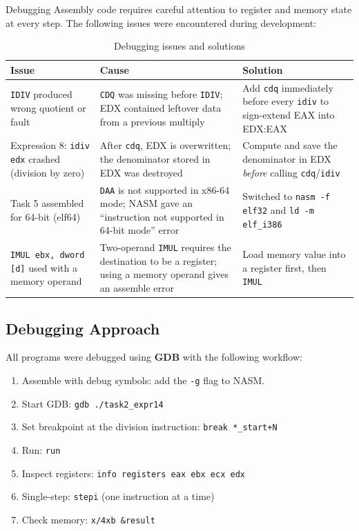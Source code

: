 \documentclass[12pt,a4paper]{article}
\begin{document}
Debugging Assembly code requires careful attention to register and memory state at every
step.  The following issues were encountered during development:

\begin{table}[H]
\centering
\caption{Debugging issues and solutions}
\small
\begin{tabular}{|p{4cm}|p{5cm}|p{5cm}|}
\hline
\textbf{Issue} & \textbf{Cause} & \textbf{Solution} \\
\hline
\texttt{IDIV} produced wrong quotient or fault & \texttt{CDQ} was missing before
\texttt{IDIV}; EDX contained leftover data from a previous multiply & Add \texttt{cdq}
immediately before every \texttt{idiv} to sign-extend EAX into EDX:EAX \\
\hline
Expression 8: \texttt{idiv edx} crashed (division by zero) & After \texttt{cdq}, EDX is
overwritten; the denominator stored in EDX was destroyed & Compute and save the
denominator in EDX \emph{before} calling \texttt{cdq}/\texttt{idiv} \\
\hline
Task 5 assembled for 64-bit (elf64) & \texttt{DAA} is not supported in x86-64 mode;
NASM gave an ``instruction not supported in 64-bit mode'' error & Switched to
\texttt{nasm -f elf32} and \texttt{ld -m elf\_i386} \\
\hline
\texttt{IMUL ebx, dword [d]} used with a memory operand & Two-operand \texttt{IMUL}
requires the destination to be a register; using a memory operand gives an assemble error
& Load memory value into a register first, then \texttt{IMUL} \\
\hline
\end{tabular}
\end{table}

\subsection{Debugging Approach}

All programs were debugged using \textbf{GDB} with the following workflow:

\begin{enumerate}
    \item Assemble with debug symbols: add the \texttt{-g} flag to NASM.
    \item Start GDB: \texttt{gdb ./task2\_expr14}
    \item Set breakpoint at the division instruction: \texttt{break *\_start+N}
    \item Run: \texttt{run}
    \item Inspect registers: \texttt{info registers eax ebx ecx edx}
    \item Single-step: \texttt{stepi} (one instruction at a time)
    \item Check memory: \texttt{x/4xb \&result}
\end{enumerate}
\end{document}
